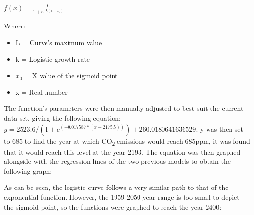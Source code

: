 \documentclass{mcmthesis}
\begin{document}
    ${\displaystyle f(x)={\frac {L}{1+e^{-k(x-x_{0})}}}}$
    
    Where:
    \begin{itemize}
        \item {L} = Curve’s maximum value
        \item {k} = Logistic growth rate
        \item ${x_0}$ = X value of the sigmoid point
        \item {x} = Real number
    \end{itemize}
    
    The function’s parameters were then manually adjusted to best suit the current data set, giving the following equation: ${y = 2523.6 / (1 + e^{(-0.017587 * (x - 2175.5))}) + 260.0180641636529}$. {y} was then set to 685 to find the year at which CO\textsubscript{2} emissions would reach 685ppm, it was found that it would reach this level at the year 2193. The equation was then graphed alongside with the regression lines of the two previous models to obtain the following graph:

    \begin{center}
    \end{center}

    As can be seen, the logistic curve follows a very similar path to that of the exponential function. However, the 1959-2050 year range is too small to depict the sigmoid point, so the functions were graphed to reach the year 2400:
\end{document}
